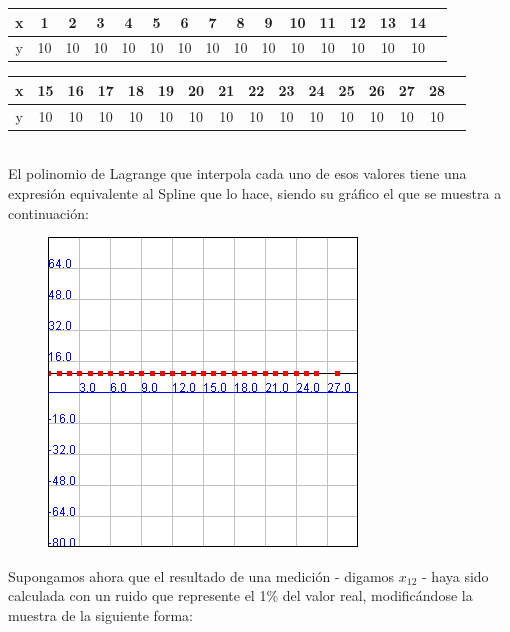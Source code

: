 \documentclass[a4paper]{article}
\begin{document}
\begin{tabular}{ | c || c | c | c | c | c |c | c | c | c | c | c | c | c | c | c |}
 \hline                 
   x & 1 & 2 & 3 & 4 & 5 & 6 & 7 & 8 & 9 & 10 & 11 & 12 & 13 & 14 \\
 \hline    
y & 10 & 10 & 10& 10& 10& 10& 10& 10& 10& 10& 10& 10& 10& 10 \\
 \hline  
 \end{tabular}

\smallskip

\begin{tabular}{  | c || c | c | c | c | c |c | c | c | c | c | c | c | c | c | c |}
 \hline                 
   x&15& 16 & 17 & 18 & 19 & 20 & 21 & 22 & 23 & 24 & 25 & 26 & 27 & 28\\
 \hline    
y & 10 & 10 & 10& 10& 10& 10& 10& 10& 10& 10& 10& 10& 10& 10 \\
 \hline  
 \end{tabular}
\bigskip
\\
El polinomio de Lagrange que interpola cada uno de esos valores tiene una expresión equivalente al Spline que lo hace, siendo su gráfico el que se muestra a continuación:
\smallskip

\begin{figure}[h!]
	\caption{}
	\begin{center}
	\includegraphics[scale=1]{imagenes/LagrangeSplinesCTE}
	\label{LagrangeSplinesCTE}
  \end{center}
\end{figure}

Supongamos ahora que el resultado de una medición - digamos $x_{12}$ - haya sido calculada con un ruido que represente el 1\% del valor real, modificándose la muestra de la siguiente forma:\\
\end{document}
